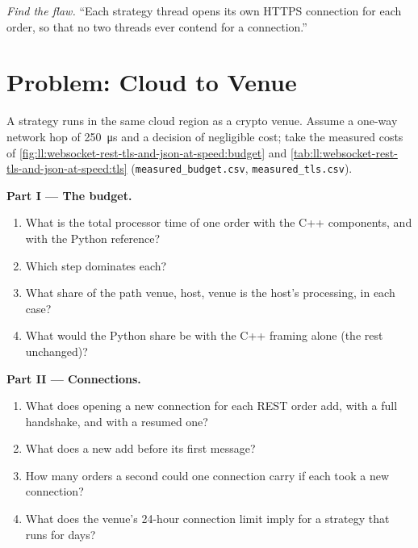\begin{exercise}[$\star\star\star$]\label{exo:ll:websocket-rest-tls-and-json-at-speed:8}
\emph{Find the flaw.} ``Each strategy thread opens its own HTTPS connection for each order, so that no two threads ever
contend for a connection.''
\end{exercise}

\section{Problem: Cloud to Venue}

\begin{problem}\label{pb:ll:websocket-rest-tls-and-json-at-speed:1}
A strategy runs in the same cloud region as a crypto venue. Assume a one-way network hop of \qty{250}{\micro\second} and a
decision of negligible cost; take the measured costs of \cref{fig:ll:websocket-rest-tls-and-json-at-speed:budget} and
\cref{tab:ll:websocket-rest-tls-and-json-at-speed:tls} (\texttt{measured\_budget.csv}, \texttt{measured\_tls.csv}).

\medskip\noindent\textbf{Part I --- The budget.}
\begin{enumerate}
\item What is the total processor time of one order with the C++ components, and with the Python reference?
\item Which step dominates each?
\item What share of the path venue, host, venue is the host's processing, in each case?
\item What would the Python share be with the C++ framing alone (the rest unchanged)?
\end{enumerate}

\medskip\noindent\textbf{Part II --- Connections.}
\begin{enumerate}[resume]
\item What does opening a new connection for each REST order add, with a full handshake, and with a resumed one?
\item What does a new  add before its first message?
\item How many orders a second could one connection carry if each took a new connection?
\item What does the venue's 24-hour connection limit imply for a strategy that runs for days?
\end{enumerate}


\end{problem}

